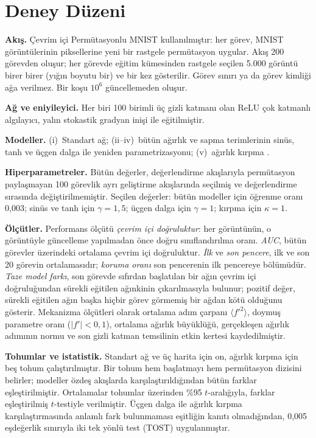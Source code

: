 \documentclass[conference,a4paper]{IEEEtran}
\begin{document}
\section{Deney Düzeni}

\textbf{Akış.} Çevrim içi Permütasyonlu MNIST \cite{goodfellow2013empirical,zenke2017continual,dohare2024loss}
kullanılmıştır: her görev, MNIST \cite{lecun1998gradient} görüntülerinin piksellerine yeni bir rastgele
permütasyon uygular. Akış 200 görevden oluşur; her görevde eğitim kümesinden rastgele seçilen 5.000 görüntü birer
birer (yığın boyutu bir) ve bir kez gösterilir. Görev sınırı ya da görev kimliği ağa verilmez. Bir koşu
$10^6$ güncellemeden oluşur.

\textbf{Ağ ve eniyileyici.} Her biri 100 birimli üç gizli katmanı olan ReLU çok katmanlı algılayıcı, yalın
stokastik gradyan inişi ile eğitilmiştir.

\textbf{Modeller.} (i)~Standart ağ; (ii--iv)~bütün ağırlık ve sapma terimlerinin sinüs, tanh ve üçgen dalga
ile yeniden parametrizasyonu; (v)~ağırlık kırpma \cite{elsayed2024weight}.

\textbf{Hiperparametreler.} Bütün değerler, değerlendirme akışlarıyla permütasyon paylaşmayan 100 görevlik ayrı
geliştirme akışlarında seçilmiş ve değerlendirme sırasında değiştirilmemiştir. Seçilen değerler: bütün modeller
için öğrenme oranı 0,003; sinüs ve tanh için $\gamma=1{,}5$; üçgen dalga için $\gamma=1$; kırpma için
$\kappa=1$.

\textbf{Ölçütler.} Performans ölçütü \emph{çevrim içi doğruluktur}: her görüntünün, o görüntüyle güncelleme
yapılmadan önce doğru sınıflandırılma oranı. \emph{AUC}, bütün görevler üzerindeki ortalama çevrim içi
doğruluktur. \emph{İlk} ve \emph{son pencere}, ilk ve son 20 görevin ortalamasıdır; \emph{koruma oranı} son
pencerenin ilk pencereye bölümüdür. \emph{Taze model farkı}, son görevde sıfırdan başlatılan bir ağın çevrim içi
doğruluğundan sürekli eğitilen ağınkinin çıkarılmasıyla bulunur; pozitif değer, sürekli eğitilen ağın başka hiçbir
görev görmemiş bir ağdan kötü olduğunu gösterir. Mekanizma ölçütleri olarak ortalama adım çarpanı
$\langle f'^2\rangle$, doymuş parametre oranı ($|f'|<0{,}1$), ortalama ağırlık büyüklüğü, gerçekleşen ağırlık
adımının normu ve son gizli katman temsilinin etkin kertesi \cite{roy2007effective} kaydedilmiştir.

\textbf{Tohumlar ve istatistik.} Standart ağ ve üç harita için on, ağırlık kırpma için beş tohum
çalıştırılmıştır. Bir tohum hem başlatmayı hem permütasyon dizisini belirler; modeller özdeş akışlarda
karşılaştırıldığından bütün farklar eşleştirilmiştir. Ortalamalar tohumlar üzerinden \%95 $t$-aralığıyla,
farklar eşleştirilmiş $t$-testiyle verilmiştir. Üçgen dalga ile ağırlık kırpma karşılaştırmasında anlamlı fark
bulunmaması eşitliğin kanıtı olmadığından, 0,005 eşdeğerlik sınırıyla iki tek yönlü test (TOST)
\cite{schuirmann1987comparison} uygulanmıştır.
\end{document}
